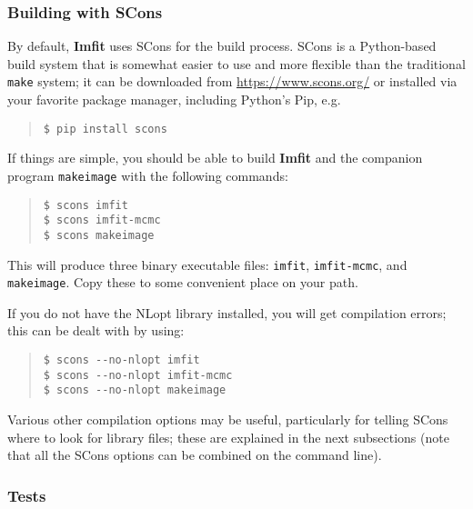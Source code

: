 \documentclass[10pt,a4paper,article]{memoir}
\newcommand{\imfit}{\textbf{Imfit}}
\newcommand{\imfitprog}{\texttt{imfit}}
\newcommand{\imfitmcmc}{\texttt{imfit-mcmc}}
\newcommand{\makeimage}{\texttt{makeimage}}
\begin{document}
\subsubsection{Building with SCons}

By default, \imfit{} uses SCons for the build process. SCons is a Python-based build system
that is somewhat easier to use and more flexible than the traditional \texttt{make}
system; it can be downloaded from \url{https://www.scons.org/} or installed via
your favorite package manager, including Python's Pip, e.g.
\begin{quote}
\texttt{\$ pip install scons}
\end{quote}

If things are simple, you should be able to build \imfit{} and the companion
program \makeimage{} with the following commands:
\begin{quote}
\texttt{\$ scons imfit} \\
\texttt{\$ scons imfit-mcmc} \\
\texttt{\$ scons makeimage}
\end{quote}
This will produce three binary executable files: \imfitprog, \imfitmcmc, and \makeimage{}. Copy
these to some convenient place on your path.

If you do not have the NLopt library installed, you will get compilation errors;
this can be dealt with by using:
\begin{quote}
\verb+$ scons --no-nlopt imfit+ \\
\verb+$ scons --no-nlopt imfit-mcmc+ \\
\verb+$ scons --no-nlopt makeimage+
\end{quote}


Various other compilation options may be useful, particularly for telling SCons where
to look for library files; these are explained in the next
subsections (note that all the SCons options can be combined on the command
line).


\subsubsection{Tests}
\end{document}
